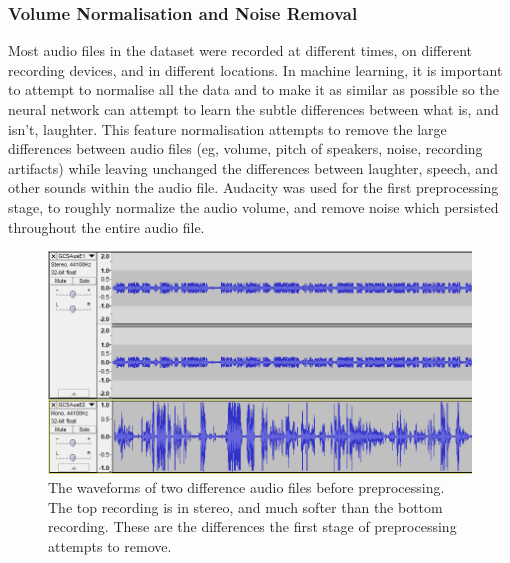 \documentclass[a4paper,11pt,notitlepage]{article}
\begin{document}
\subsubsection{Volume Normalisation and Noise Removal}

Most audio files in the dataset were recorded at different times, on different recording devices, and in different locations. In machine learning, it is important to attempt to normalise all the data and to make it as similar as possible so the neural network can attempt to learn the subtle differences between what is, and isn't, laughter. This feature normalisation attempts to remove the large differences between audio files (eg, volume, pitch of speakers, noise, recording artifacts) while leaving unchanged the differences between laughter, speech, and other sounds within the audio file. Audacity was used for the first preprocessing stage, to roughly normalize the audio volume, and remove noise which persisted throughout the entire audio file.

\begin{figure}[H]
	\centering
	\vspace{0.5cm}
	\includegraphics[scale = 0.5]{figs/origional_waveforms.png}
	\caption{The waveforms of two difference audio files before preprocessing. The top recording is in stereo, and much softer than the bottom recording. These are the differences the first stage of preprocessing attempts to remove.}
	\label{before_preprocessing}
\end{figure}
\end{document}

